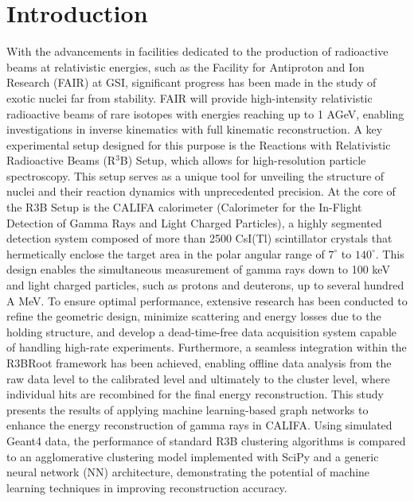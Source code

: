 \documentclass[final,5p,times,twocolumn]{elsarticle}
\begin{document}
\section{Introduction}
\label{sec:intro}
With the advancements in facilities dedicated to the production of radioactive beams at relativistic energies, such as the Facility for Antiproton and Ion Research (FAIR) at GSI, significant progress has been made in the study of exotic nuclei far from stability\cite{kalantar2024experiments}. FAIR will provide high-intensity relativistic radioactive beams of rare isotopes with energies reaching up to 1 AGeV, enabling investigations in inverse kinematics with full kinematic reconstruction\cite{leifels2025status}.
A key experimental setup designed for this purpose is the Reactions with Relativistic Radioactive Beams (R$^3$B) Setup, which allows for high-resolution particle spectroscopy. This setup serves as a unique tool for unveiling the structure of nuclei and their reaction dynamics with unprecedented precision.\newline
At the core of the R3B Setup is the CALIFA calorimeter (Calorimeter for the In-Flight Detection of Gamma Rays and Light Charged Particles), a highly segmented detection system composed of more than 2500 CsI(Tl) scintillator crystals that hermetically enclose the target area in the polar angular range of $7^\circ$ to $140^\circ$. This design enables the simultaneous measurement of gamma rays down to 100 keV and light charged particles, such as protons and deuterons, up to several hundred A MeV\cite{cortina2014califa}. To ensure optimal performance, extensive research has been conducted to refine the geometric design, minimize scattering and energy losses due to the holding structure\cite{alvarez2014performance}, and develop a dead-time-free data acquisition system capable of handling high-rate experiments\cite{ledigital}. Furthermore, a seamless integration within the R3BRoot framework\cite{bertini2011r3broot} has been achieved, enabling offline data analysis from the raw data level to the calibrated level and ultimately to the cluster level, where individual hits are recombined for the final energy reconstruction.\newline
This study presents the results of applying machine learning-based graph networks to enhance the energy reconstruction of gamma rays in CALIFA. Using simulated Geant4 data, the performance of standard R3B clustering algorithms is compared to an agglomerative clustering model implemented with SciPy\cite{virtanen2020scipy} and a generic neural network (NN) architecture, demonstrating the potential of machine learning techniques in improving reconstruction accuracy.\newline
\end{document}
